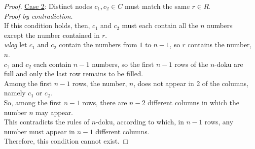 \documentclass[a4paper,addpoints]{exam}
\begin{document}
\begin{questions}
\begin{parts}
\begin{solution}
\begin{proof}
        \underline{Case 2}: Distinct nodes $c_1,c_2\in C$ must match the same $r\in R$.\\
        \textit{Proof by contradiction}.\\
        If this condition holds, then, $c_1$ and $c_2$ must each contain all the $n$ numbers except the number contained in $r$.\\
        \textit{wlog} let $c_1$ and $c_2$ contain the numbers from $1$ to $n-1$, so $r$ contains the number, $n$.\\
        $c_1$ and $c_2$ each contain $n-1$ numbers, so the first $n-1$ rows of the $n$-doku are full and only the last row remains to be filled.\\
        Among the first $n-1$ rows, the number, $n$, does not appear in 2 of the columns, namely $c_1$ or $c_2$.\\
        So, among the first $n-1$ rows, there are $n-2$ different columns in which the number $n$ may appear.\\
        This contradicts the rules of $n$-doku, according to which, in $n-1$ rows, any number must appear in $n-1$ different columns.\\
        Therefore, this condition cannot exist.
      \end{proof}
    \end{solution}
  \end{parts}
\end{questions}
\end{document}
